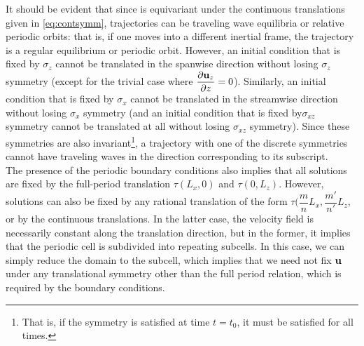 It should be evident that since \pCf is equivariant under the continuous translations given in \eqref{eq:contsymm}, trajectories can be traveling wave equilibria or relative periodic orbits: that is, if one moves into a different inertial frame, the trajectory is a regular equilibrium or periodic orbit. However, an initial condition that is fixed by $\sigma_z$ cannot be translated in the spanwise direction without losing $\sigma_z$ symmetry (except for the trivial case where $\pder{1}{\Vector{u}_z}{z} = 0$). Similarly, an initial condition that is fixed by $\sigma_x$ cannot be translated in the streamwise direction without losing $\sigma_x$ symmetry (and an initial condition that is fixed by$\sigma_{xz}$ symmetry cannot be translated at all without losing $\sigma_{xz}$ symmetry). Since these symmetries are also invariant\footnote{That is, if the symmetry is satisfied at time $t = t_0$, it must be satisfied for all times.}, a trajectory with one of the discrete symmetries cannot have traveling waves in the direction corresponding to its subscript. \\

The presence of the periodic boundary conditions also implies that all solutions are fixed by the full-period translation $\tau(L_x,0)$ and $\tau(0,L_z)$. However, solutions can also be fixed by any rational translation of the form $\tau(\dfrac{m}{n}L_x,\dfrac{m'}{n'}L_z$, or by the continuous translations. In the latter case, the velocity field is necessarily constant along the translation direction, but in the former, it implies that the periodic cell is subdivided into repeating subcells. In this case, we can simply reduce the domain to the subcell, which implies that we need not fix $\mathbf{u}$ under any translational symmetry other than the full period relation, which is required by the boundary conditions. \\

